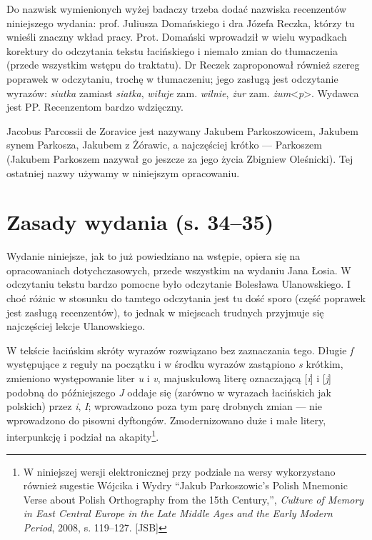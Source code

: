 \documentclass[dvipsnames,12pt]{report}
\begin{document}
Do nazwisk wymienionych wyżej badaczy trzeba dodać nazwiska
recenzentów niniejszego wydania: prof. Juliusza Domańskiego i dra
Józefa Reczka, którzy tu wnieśli znaczny wkład pracy. Prot. Domański
wprowadził w wielu wypadkach korektury do odczytania tekstu
łacińskiego i niemało zmian do tłumaczenia (przede wszystkim wstępu do
traktatu). Dr Reczek zaproponował również szereg poprawek w
odczytaniu,
trochę w tłumaczeniu; jego zasługą jest odczytanie wyrazów:
\textit{siutka} zamiast \textit{siatka}, \textit{wiłuje}
zam. \textit{wilnie}, \textit{żur} zam. \textit{żum}<\textit{p}>.
Wydawca jest PP. Recenzentom bardzo wdzięczny.

Jacobus Parcossii de Zoravice jest nazywany Jakubem Parkoszowicem,
Jakubem synem Parkosza, Jakubem z Żórawic, a najczęściej krótko ---
Parkoszem (Jakubem Parkoszem nazywał go jeszcze za jego życia Zbigniew
Oleśnicki). Tej ostatniej nazwy używamy w niniejszym opracowaniu.

\section*{Zasady wydania (s. 34--35)}
\label{sec:zasady-wydania}%


Wydanie niniejsze, jak to już powiedziano na wstępie, opiera się na
opracowaniach dotychczasowych, przede wszystkim na wydaniu Jana
Łosia. W odczytaniu tekstu bardzo pomocne było odczytanie Bolesława
Ulanowskiego. I choć różnic w stosunku do tamtego odczytania jest tu
dość sporo (część poprawek jest zasługą recenzentów), to jednak w
miejscach trudnych przyjmuje się najczęściej lekcje Ulanowskiego.


W tekście łacińskim skróty wyrazów rozwiązano bez zaznaczania
tego. Długie \textit{ſ} występujące z reguły na początku i w środku
wyrazów zastąpiono \textit{s} krótkim, zmieniono występowanie liter
\textit{u} i \textit{v}, majuskułową literę oznaczającą [\textit{i}] i
[\textit{j}] podobną do późniejszego \textit{J} oddaje się (zarówno w
wyrazach łacińskich jak polskich) przez \textit{i}, \textit{I};
wprowadzono poza tym parę drobnych zmian --- nie wprowadzono do
pisowni dyftongów. Zmodernizowano duże i małe litery, interpunkcję i
podział na akapity\footnote{W niniejszej wersji elektronicznej
przy podziale na wersy wykorzystano również sugestie Wójcika i Wydry ``{Jakub
    {Parkoszowic}'s {Polish} {Mnemonic} {Verse} about {Polish}
    {Orthography} from the 15th {Century}},'', \textit{Culture of
    Memory in East Central Europe in the Late Middle Ages and the
    Early Modern Period}, 2008, s. 119--127. [JSB]}.
\end{document}

